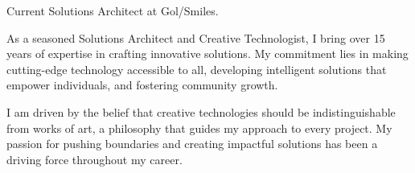 

\begin{cvparagraph}

Current Solutions Architect at Gol/Smiles.

As a seasoned Solutions Architect and Creative Technologist, I bring over 15 years of expertise in crafting innovative solutions. My commitment lies in making cutting-edge technology accessible to all, developing intelligent solutions that empower individuals, and fostering community growth.

I am driven by the belief that creative technologies should be indistinguishable from works of art, a philosophy that guides my approach to every project. My passion for pushing boundaries and creating impactful solutions has been a driving force throughout my career.
\end{cvparagraph}
